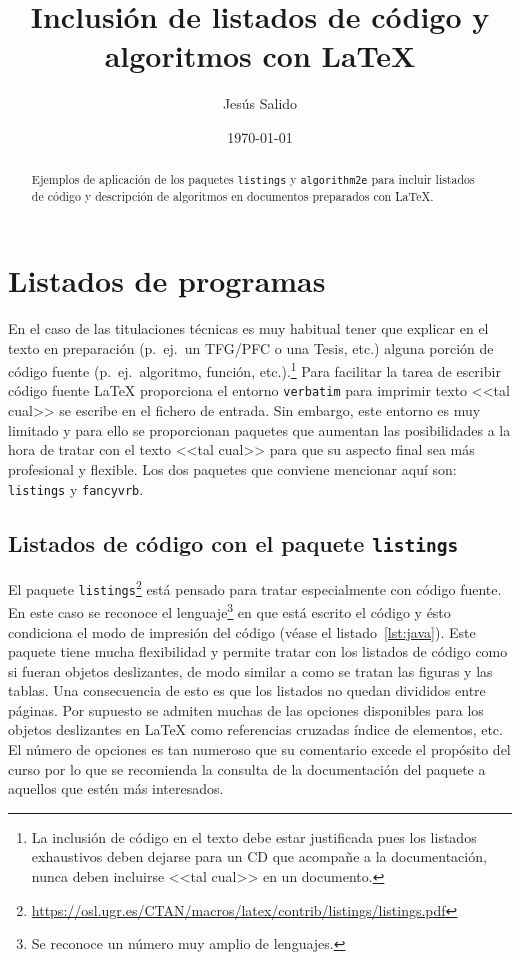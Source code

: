 \documentclass[11pt,a4paper]{article}
\author{Jesús Salido}
\title{Inclusión de listados de código y algoritmos con \LaTeX{}}
\date{\today}
\begin{document}
\maketitle

\begin{abstract}
	Ejemplos de aplicación de los paquetes \texttt{listings} y \texttt{algorithm2e} para incluir listados de código y descripción de algoritmos en documentos preparados con  \LaTeX{}.
\end{abstract}


\renewcommand{\lstlistlistingname}{Índice de listados} %
\renewcommand{\lstlistingname}{Listado} %

\tableofcontents
\lstlistoflistings
\listofalgorithms


\section{Listados de programas}
En el caso de las titulaciones técnicas es muy habitual tener que explicar en el texto en preparación (p.~ej.\ un TFG/PFC o una Tesis, etc.) alguna porción de código fuente (p.~ej.\ algoritmo, función, etc.).\footnote{La inclusión de código en el texto debe estar justificada pues los listados exhaustivos deben dejarse para un CD que acompañe a la documentación, nunca deben incluirse <<tal cual>> en un documento.} Para facilitar la tarea de escribir código fuente \LaTeX{} proporciona el entorno \texttt{verbatim} para imprimir texto <<tal cual>> se escribe en el fichero de entrada. Sin embargo, este entorno es muy limitado y para ello se proporcionan paquetes que aumentan las posibilidades a la hora de tratar con el texto <<tal cual>> para que su aspecto final sea más profesional y flexible. Los dos paquetes que conviene mencionar aquí son: \texttt{listings} y \texttt{fancyvrb}.


\subsection{Listados de código con el paquete \texttt{listings}}
El paquete \texttt{listings}\footnote{\url{https://osl.ugr.es/CTAN/macros/latex/contrib/listings/listings.pdf}} está pensado para tratar especialmente con código fuente. En este caso se reconoce el lenguaje\footnote{Se reconoce un número muy amplio de lenguajes.} en que está escrito el código y ésto condiciona el modo de impresión del código (véase el listado~\ref{lst:java}). Este paquete tiene mucha flexibilidad y permite tratar con los listados de código como si fueran objetos deslizantes, de modo similar a como se tratan las figuras y las tablas. Una consecuencia de esto es que los listados no quedan divididos entre páginas. Por supuesto se admiten muchas de las opciones disponibles para los objetos deslizantes en \LaTeX{} como referencias cruzadas índice de elementos, etc. El número de opciones es tan numeroso que su comentario excede el propósito del curso por lo que se recomienda la consulta de la documentación del paquete a aquellos que estén más interesados.
\end{document}
